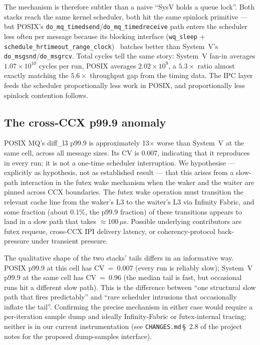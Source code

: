 \documentclass[a4paper,11pt]{article}
\begin{document}
The mechanism is therefore subtler than a naive ``SysV holds a queue
lock''. Both stacks reach the same kernel scheduler, both hit the
same spinlock primitive --- but POSIX's
\texttt{do\_mq\_timedsend}/\texttt{do\_mq\_timedreceive} path enters
the scheduler less often per message because its blocking interface
(\texttt{wq\_sleep} +
\texttt{schedule\_hrtimeout\_range\_clock})~\cite{linux_mq_overview,linux_futex}
batches better than System~V's \texttt{do\_msgsnd}/\texttt{do\_msgrcv}.
Total cycles tell the same story: System~V fan-in averages
$1.07\times 10^{10}$ cycles per run, POSIX averages
$2.02\times 10^{9}$, a $5.3\times$ ratio almost exactly matching the
$5.6\times$ throughput gap from the timing data. The IPC layer feeds
the scheduler proportionally less work in POSIX, and proportionally
less spinlock contention follows.

\subsection{The cross-CCX p99.9 anomaly}
\label{sec:disc:ccx}

POSIX MQ's diff\_l3 p99.9 is approximately 13$\times$ worse than
System~V at the same cell, across all message sizes. Its CV is
$0.007$, indicating that it reproduces in every run; it is not
a one-time scheduler interruption. We hypothesise --- explicitly as
hypothesis, not as established result --- that this arises from a
slow-path interaction in the futex wake mechanism when the waker and
the waiter are pinned across CCX boundaries. The futex wake operation
must transition the relevant cache line from the waker's L3 to the
waiter's L3 via Infinity Fabric, and some fraction (about $0.1\%$, the
p99.9 fraction) of these transitions appears to land in a slow path
that takes $\approx 100\,\mu$s. Possible underlying contributors are
futex requeue, cross-CCX IPI delivery latency, or coherency-protocol
back-pressure under transient pressure.

The qualitative shape of the two stacks' tails differs in an
informative way. POSIX p99.9 at this cell has CV~=~0.007 (every run is
reliably slow); System~V p99.9 at the same cell has CV~=~0.96 (the
median tail is fast, but occasional runs hit a different slow path).
This is the difference between ``one structural slow path that fires
predictably'' and ``rare scheduler intrusions that occasionally
inflate the tail''. Confirming the precise mechanism in either case
would require a per-iteration sample dump and ideally Infinity-Fabric
or futex-internal tracing; neither is in our current instrumentation
(see \texttt{CHANGES.md}\,\S~2.8 of the project notes for the
proposed dump-samples interface).
\end{document}
